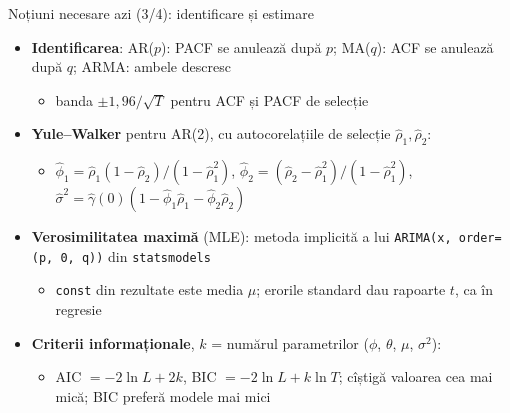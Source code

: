 \begin{frame}{Noțiuni necesare azi (3/4): identificare și estimare}
\itemsize{\small}
\begin{itemize}
    \item \textbf{Identificarea}: AR($p$): PACF se anulează după $p$; MA($q$): ACF se anulează după $q$; ARMA: ambele descresc
    \begin{itemize}
        \item banda $\pm 1{,}96/\sqrt{T}$ pentru ACF și PACF de selecție
    \end{itemize}
    \item \textbf{Yule--Walker} pentru AR(2), cu autocorelațiile de selecție $\hat\rho_1, \hat\rho_2$:
    \begin{itemize}
        \item $\hat\phi_1 = \hat\rho_1(1 - \hat\rho_2)/(1 - \hat\rho_1^2)$, $\hat\phi_2 = (\hat\rho_2 - \hat\rho_1^2)/(1 - \hat\rho_1^2)$, $\hat\sigma^2 = \hat\gamma(0)(1 - \hat\phi_1\hat\rho_1 - \hat\phi_2\hat\rho_2)$
    \end{itemize}
    \item \textbf{Verosimilitatea maximă} (MLE): metoda implicită a lui \texttt{ARIMA(x, order=(p, 0, q))} din \texttt{statsmodels}
    \begin{itemize}
        \item \texttt{const} din rezultate este media $\mu$; erorile standard dau rapoarte $t$, ca în regresie
    \end{itemize}
    \item \textbf{Criterii informaționale}, $k$ = numărul parametrilor ($\phi$, $\theta$, $\mu$, $\sigma^2$):
    \begin{itemize}
        \item AIC $= -2\ln L + 2k$, BIC $= -2\ln L + k\ln T$; cîștigă valoarea cea mai mică; BIC preferă modele mai mici
    \end{itemize}
\end{itemize}
\end{frame}

